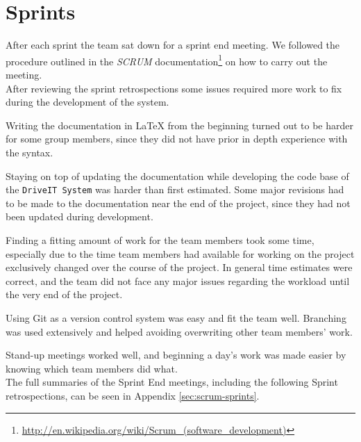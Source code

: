 \section{Sprints}
After each sprint the team sat down for a sprint end meeting. We followed the procedure outlined in the \textit{SCRUM} documentation\footnote{\url{http://en.wikipedia.org/wiki/Scrum_(software_development)}} on how to carry out the meeting.\\

After reviewing the sprint retrospections some issues required more work to fix during the development of the system.

Writing the documentation in LaTeX from the beginning turned out to be harder for some group members, since they did not have prior in depth experience with the syntax. 

Staying on top of updating the documentation while developing the code base of the \texttt{DriveIT System} was harder than first estimated. Some major revisions had to be made to the documentation near the end of the project, since they had not been updated during development.

Finding a fitting amount of work for the team members took some time, especially due to the time team members had available for working on the project exclusively changed over the course of the project. In general time estimates were correct, and the team did not face any major issues regarding the workload until the very end of the project.

Using Git as a version control system was easy and fit the team well. Branching was used extensively and helped avoiding overwriting other team members' work. 

Stand-up meetings worked well, and beginning a day's work was made easier by knowing which team members did what. \\

The full summaries of the Sprint End meetings, including the following Sprint retrospections, can be seen in Appendix \ref{sec:scrum-sprints}.

